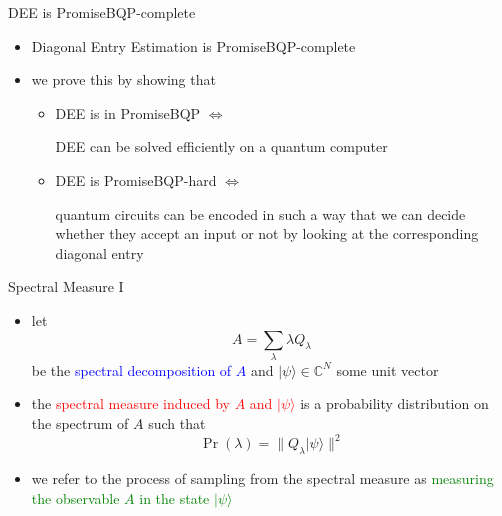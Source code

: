 \documentclass[slideColor]{prosper}
\newcommand{\C}{{\mathbb{C}}}
\renewcommand{\>}{\rangle}
\newcommand{\<}{\langle}
\begin{document}

\begin{slide}{DEE is PromiseBQP-complete}

\begin{itemize}
\item Diagonal Entry Estimation is PromiseBQP-complete

\medskip
\item we prove this by showing that

\medskip
\begin{itemize}
\item DEE is in PromiseBQP $\Leftrightarrow$

\medskip
DEE can be solved efficiently on a quantum computer 

\medskip
\item DEE is PromiseBQP-hard $\Leftrightarrow$

\medskip
quantum circuits can be encoded in such a way that we can decide whether they accept an input or not by looking at the corresponding diagonal entry
\end{itemize}
\end{itemize}

\end{slide}


\begin{slide}{Spectral Measure I}
\begin{itemize}
\item let 
\[
A = \sum_\lambda \lambda Q_\lambda
\]
be the \textcolor{blue}{spectral decomposition of $A$} and $|\psi\>\in\C^N$ some unit vector

\medskip
\item the \textcolor{red}{spectral measure induced by $A$ and $|\psi\>$} is a probability distribution on the spectrum of $A$ such that 
\[
\Pr(\lambda) = \|Q_\lambda |\psi\> \|^2
\]

\medskip
\item we refer to the process of sampling from the spectral measure as \textcolor{green}{measuring the observable $A$ in the state $|\psi\>$}

\end{itemize}
\end{slide}

\end{document}
